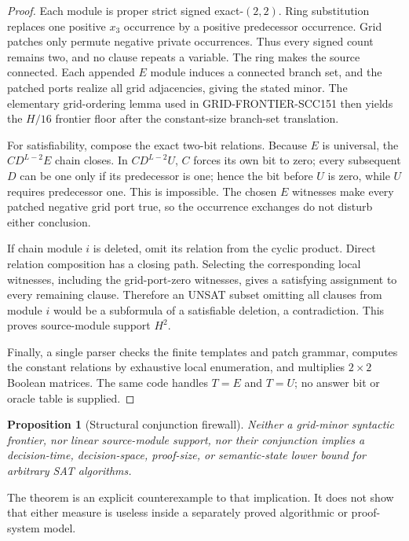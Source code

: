 \documentclass[11pt]{article}
\newtheorem{proposition}[theorem]{Proposition}
\begin{document}
\begin{proof}
Each module is proper strict signed exact-$(2,2)$.  Ring substitution replaces
one positive $x_3$ occurrence by a positive predecessor occurrence.  Grid
patches only permute negative private occurrences.  Thus every signed count
remains two, and no clause repeats a variable.  The ring makes the source
connected.  Each appended $E$ module induces a connected branch set, and the
patched ports realize all grid adjacencies, giving the stated minor.  The
elementary grid-ordering lemma used in GRID-FRONTIER-SCC151 then yields the
$H/16$ frontier floor after the constant-size branch-set translation.

For satisfiability, compose the exact two-bit relations.  Because $E$ is
universal, the $C D^{L-2}E$ chain closes.  In $C D^{L-2}U$, $C$ forces its own
bit to zero; every subsequent $D$ can be one only if its predecessor is one;
hence the bit before $U$ is zero, while $U$ requires predecessor one.  This is
impossible.  The chosen $E$ witnesses make every patched negative grid port
true, so the occurrence exchanges do not disturb either conclusion.

If chain module $i$ is deleted, omit its relation from the cyclic product.
Direct relation composition has a closing path.  Selecting the corresponding
local witnesses, including the grid-port-zero witnesses, gives a satisfying
assignment to every remaining clause.  Therefore an UNSAT subset omitting
all clauses from module $i$ would be a subformula of a satisfiable deletion,
a contradiction.  This proves source-module support $H^2$.

Finally, a single parser checks the finite templates and patch grammar,
computes the constant relations by exhaustive local enumeration, and
multiplies $2\times2$ Boolean matrices.  The same code handles $T=E$ and
$T=U$; no answer bit or oracle table is supplied.
\end{proof}

\begin{proposition}[Structural conjunction firewall]
Neither a grid-minor syntactic frontier, nor linear source-module support,
nor their conjunction implies a decision-time, decision-space, proof-size,
or semantic-state lower bound for arbitrary SAT algorithms.
\end{proposition}
The theorem is an explicit counterexample to that implication.  It does not
show that either measure is useless inside a separately proved algorithmic or
proof-system model.
\end{document}

